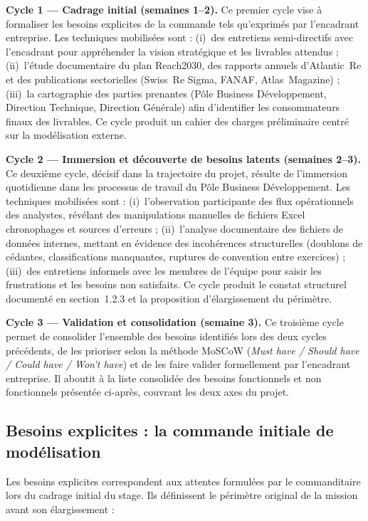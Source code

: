 \documentclass[../main.tex]{subfiles}
\begin{document}
\textbf{Cycle 1 --- Cadrage initial (semaines 1--2).} Ce premier cycle vise à formaliser les besoins explicites de la commande tels qu'exprimés par l'encadrant entreprise. Les techniques mobilisées sont : (i)~des entretiens semi-directifs avec l'encadrant pour appréhender la vision stratégique et les livrables attendus ; (ii)~l'étude documentaire du plan Reach2030, des rapports annuels d'Atlantic~Re et des publications sectorielles (Swiss~Re Sigma, FANAF, Atlas~Magazine) ; (iii)~la cartographie des parties prenantes (Pôle Business Développement, Direction Technique, Direction Générale) afin d'identifier les consommateurs finaux des livrables. Ce cycle produit un cahier des charges préliminaire centré sur la modélisation externe.

\textbf{Cycle 2 --- Immersion et découverte de besoins latents (semaines 2--3).} Ce deuxième cycle, décisif dans la trajectoire du projet, résulte de l'immersion quotidienne dans les processus de travail du Pôle Business Développement. Les techniques mobilisées sont : (i)~l'observation participante des flux opérationnels des analystes, révélant des manipulations manuelles de fichiers Excel chronophages et sources d'erreurs ; (ii)~l'analyse documentaire des fichiers de données internes, mettant en évidence des incohérences structurelles (doublons de cédantes, classifications manquantes, ruptures de convention entre exercices) ; (iii)~des entretiens informels avec les membres de l'équipe pour saisir les frustrations et les besoins non satisfaits. Ce cycle produit le constat structurel documenté en section~1.2.3 et la proposition d'élargissement du périmètre.

\textbf{Cycle 3 --- Validation et consolidation (semaine 3).} Ce troisième cycle permet de consolider l'ensemble des besoins identifiés lors des deux cycles précédents, de les prioriser selon la méthode MoSCoW (\textit{Must have / Should have / Could have / Won't have}) et de les faire valider formellement par l'encadrant entreprise. Il aboutit à la liste consolidée des besoins fonctionnels et non fonctionnels présentée ci-après, couvrant les deux axes du projet.

\subsection{Besoins explicites : la commande initiale de modélisation}

Les besoins explicites correspondent aux attentes formulées par le commanditaire lors du cadrage initial du stage. Ils définissent le périmètre original de la mission avant son élargissement :
\end{document}
